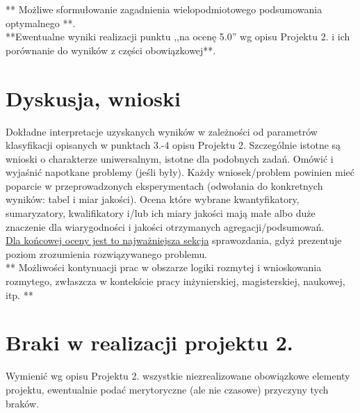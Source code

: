 \documentclass{classrep}
\begin{document}
** Możliwe sformułowanie zagadnienia wielopodmiotowego podsumowania optymalnego **.\\

{**Ewentualne wyniki realizacji punktu ,,na ocenę 5.0'' wg opisu Projektu 2. i ich porównanie do wyników z
części obowiązkowej**.}\\



\section{Dyskusja, wnioski}
Dokładne interpretacje uzyskanych wyników w zależności od parametrów klasyfikacji
opisanych w punktach 3.-4 opisu Projektu 2. 
Szczególnie istotne są wnioski o charakterze uniwersalnym, istotne dla podobnych zadań. 
Omówić i wyjaśnić napotkane problemy (jeśli były). Każdy wniosek/problem powinien mieć poparcie
w przeprowadzonych eksperymentach (odwołania do konkretnych wyników: tabel i miar
jakości). Ocena które wybrane kwantyfikatory, sumaryzatory, kwalifikatory i/lub ich
miary jakości mają małe albo duże znaczenie dla wiarygodności i jakości otrzymanych
agregacji/podsumowań.  \\
\underline{Dla końcowej oceny jest to najważniejsza sekcja} sprawozdania, gdyż prezentuje poziom
zrozumienia rozwiązywanego problemu.\\

** Możliwości kontynuacji prac w obszarze logiki rozmytej i wnioskowania rozmytego, zwłaszcza w kontekście pracy inżynierskiej,
magisterskiej, naukowej, itp. **\\



\section{Braki w realizacji projektu 2.}
Wymienić wg opisu Projektu 2. wszystkie niezrealizowane obowiązkowe elementy projektu, ewentualnie
podać merytoryczne (ale nie czasowe) przyczyny tych braków. 
\end{document}
